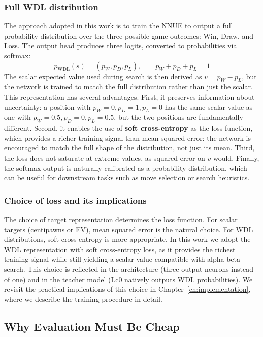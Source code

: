 \subsubsection{Full WDL distribution}\label{sec:wdl}

The approach adopted in this work is to train the NNUE to output a full probability distribution over the three possible game outcomes: Win, Draw, and Loss. The output head produces three logits, converted to probabilities via softmax:
\[
p_{\mathrm{WDL}}(s) = (p_W, p_D, p_L), \qquad p_W + p_D + p_L = 1
\]
The scalar expected value used during search is then derived as \(v = p_W - p_L\), but the network is trained to match the full distribution rather than just the scalar. This representation has several advantages. First, it preserves information about uncertainty: a position with \(p_W = 0, p_D = 1, p_L = 0\) has the same scalar value as one with \(p_W = 0.5, p_D = 0, p_L = 0.5\), but the two positions are fundamentally different. Second, it enables the use of \textbf{soft cross-entropy} as the loss function, which provides a richer training signal than mean squared error: the network is encouraged to match the full shape of the distribution, not just its mean. Third, the loss does not saturate at extreme values, as squared error on \(v\) would. Finally, the softmax output is naturally calibrated as a probability distribution, which can be useful for downstream tasks such as move selection or search heuristics.

\subsubsection{Choice of loss and its implications}\label{sec:loss-choice}

The choice of target representation determines the loss function. For scalar targets (centipawns or EV), mean squared error is the natural choice. For WDL distributions, soft cross-entropy is more appropriate. In this work we adopt the WDL representation with soft cross-entropy loss, as it provides the richest training signal while still yielding a scalar value compatible with alpha-beta search. This choice is reflected in the architecture (three output neurons instead of one) and in the teacher model (Lc0 natively outputs WDL probabilities). We revisit the practical implications of this choice in Chapter~\ref{ch:implementation}, where we describe the training procedure in detail.

\subsection{Why Evaluation Must Be Cheap}\label{sec:eval-cheap}


